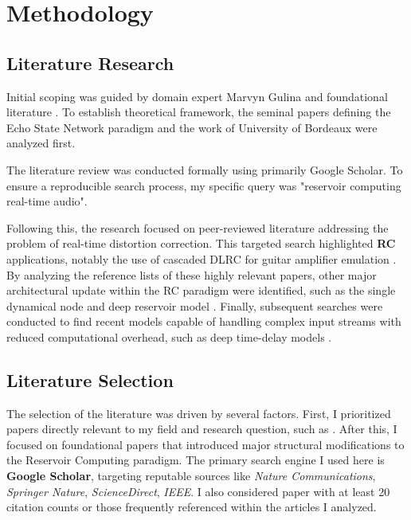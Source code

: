 
\section{Methodology}


\subsection{Literature Research}

Initial scoping was guided by domain expert Marvyn Gulina \cite{Gulina23Koopman, Gulina17Chaos} and foundational literature \cite{Jaeger10ESN}. To establish theoretical framework, the seminal papers defining the Echo State Network \cite{Jaeger10ESN} paradigm and the work of University of Bordeaux \cite{Trouvain2020ReservoirPy} were analyzed first. 

\vspace{0.5cm}

The literature review was conducted formally using primarily Google Scholar. To ensure a reproducible search process,  my specific query was "reservoir computing real-time audio". 

\vspace{0.5cm}

Following this, the research focused on peer-reviewed literature addressing the problem of real-time distortion correction. This targeted search highlighted \textbf{RC} applications, notably the use of cascaded DLRC for guitar amplifier emulation \cite{Keuninckx2017RealTime}. By analyzing the reference lists of these highly relevant papers, other major architectural update within the RC paradigm were identified, such as the single dynamical node \cite{Appeltant2011Information} and deep reservoir model \cite{Gallicchio2017}. Finally, subsequent searches were conducted to find recent models capable of handling complex input streams with reduced computational overhead, such as deep time-delay models \cite{goldmann2020deep}.

\subsection{Literature Selection}

The selection of the literature was driven by several factors. First, I prioritized papers directly relevant to my field and research question, such as \cite{Keuninckx2017RealTime}. After this, I focused on foundational papers that introduced major structural modifications to the Reservoir Computing paradigm. The primary search engine I used here is \textbf{Google Scholar}, targeting reputable sources like \textit{Nature Communications}, \textit{Springer Nature}, \textit{ScienceDirect}, \textit{IEEE}. I also considered paper with at least 20 citation counts or those frequently referenced within the articles I analyzed.

